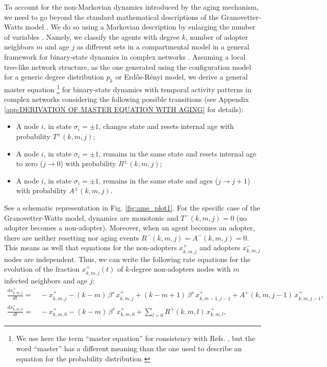 To account for the non-Markovian dynamics introduced by the aging mechanism, we need to go beyond the standard mathematical descriptions of the Granovetter-Watts model \cite{gleeson-2007,gleeson-2008,gleeson-2013}. We do so using a Markovian description by enlarging the number of variables \cite{peralta-2020C,peralta-2020A}. Namely, we classify the agents with degree $k$, number of adopter neighbors $m$ and age $j$ as different sets in a compartmental model in a general framework for binary-state dynamics in complex networks \cite{watts-2002, gleeson-2011,gleeson-2013}. Assuming a local tree-like network structure, as the one generated using the configuration model for a generic degree distribution $p_k$ \cite{molloy-1995,newman-2001} or Erd\H{o}s-R\'enyi model, we derive a general master equation \footnote{We use here the term  ``master equation'' for consistency with  Refs. \cite{gleeson-2011,gleeson-2013}, but the word ``master'' has a different meaning than the one used to describe an equation for the probability distribution \cite{peralta-2020B}} for binary-state dynamics with temporal activity patterns in complex networks considering the following possible transitions (see Appendix \ref{app:DERIVATION OF MASTER EQUATION WITH AGING} for details):
\begin{itemize}
    \item A node $i$, in state $\sigma_i = \pm 1$, changes state and resets internal age with probability $T^{\pm} (k,m,j)$;
    \item A node $i$, in state $\sigma_i = \pm 1$, remains in the same state and resets internal age to zero ($j \to 0$) with probability $R^{\pm} (k,m,j)$;
    \item A node $i$, in state $\sigma_i = \pm 1$, remains in the same state and ages ($j \to j+1$) with probability $A^{\pm} (k,m,j)$.
\end{itemize}
See a schematic representation in Fig. \ref{fig:ame_plot1}. For the specific case of the Granovetter-Watts model, dynamics are monotonic and $T^{-} (k,m,j) = 0$ (no adopter becomes a non-adopter). Moreover, when an agent becomes an adopter, there are neither resetting nor aging events $R^{-} (k,m,j) = A^{-} (k,m,j) = 0$. This means as well that equations for the non-adopters $x^{+}_{k,m,j}$ and adopters $x^{-}_{k,m,j}$ nodes are independent. Thus, we can write the following rate equations for the evolution of the fraction $x^{+}_{k,m,j} (t)$ of $k$-degree non-adopters nodes with $m$ infected neighbors and age $j$:
\begin{align}
\label{eq:AME_Threshold}
\frac{d x^{+}_{k,m,j}}{dt} = & \,  - x^{+}_{k,m,j} - (k-m)\, \beta^s \, x^{+}_{k,m,j} + (k-m+1) \, \beta^s \, x^{+}_{k,m-1,j-1} + A^{+} (k,m,j-1)\, x^{+}_{k,m,j-1},  \\
\frac{d x^{+}_{k,m,0}}{dt}  = & \,   - x^{+}_{k,m,0} - (k - m)\, \beta^s   \,x^{+}_{k,m,0} + \sum_{l = 0} R^{+} (k,m,l)\, x^{+}_{k,m,l}, \nonumber 
\end{align}
